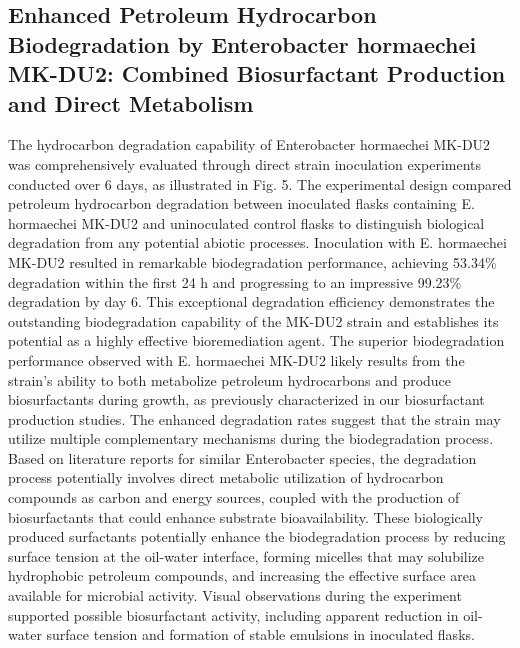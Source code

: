 \documentclass{svjour3}
\begin{document}
\subsection{Enhanced Petroleum Hydrocarbon Biodegradation by Enterobacter hormaechei MK-DU2: Combined Biosurfactant Production and Direct Metabolism}
The hydrocarbon degradation capability of Enterobacter hormaechei MK-DU2 was comprehensively evaluated through direct strain inoculation experiments conducted over 6 days, as illustrated in Fig. 5. The experimental design compared petroleum hydrocarbon degradation between inoculated flasks containing E. hormaechei MK-DU2 and uninoculated control flasks to distinguish biological degradation from any potential abiotic processes. Inoculation with E. hormaechei MK-DU2 resulted in remarkable biodegradation performance, achieving 53.34\% degradation within the first 24 h and progressing to an impressive 99.23\% degradation by day 6. This exceptional degradation efficiency demonstrates the outstanding biodegradation capability of the MK-DU2 strain and establishes its potential as a highly effective bioremediation agent.
The superior biodegradation performance observed with E. hormaechei MK-DU2 likely results from the strain’s ability to both metabolize petroleum hydrocarbons and produce biosurfactants during growth, as previously characterized in our biosurfactant production studies. The enhanced degradation rates suggest that the strain may utilize multiple complementary mechanisms during the biodegradation process. Based on literature reports for similar Enterobacter species, the degradation process potentially involves direct metabolic utilization of hydrocarbon compounds as carbon and energy sources, coupled with the production of biosurfactants that could enhance substrate bioavailability. These biologically produced surfactants potentially enhance the biodegradation process by reducing surface tension at the oil-water interface, forming micelles that may solubilize hydrophobic petroleum compounds, and increasing the effective surface area available for microbial activity. Visual observations during the experiment supported possible biosurfactant activity, including apparent reduction in oil-water surface tension and formation of stable emulsions in inoculated flasks.
\end{document}
